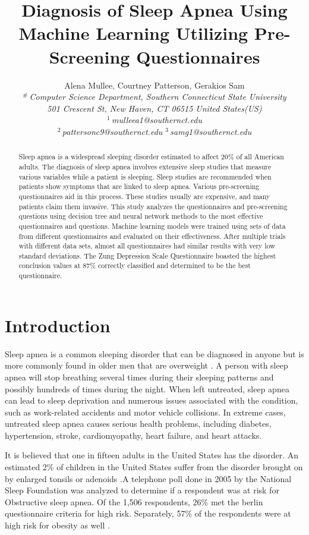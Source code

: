 \documentclass[10pt,conference,a4paper]{IEEEtran}
\title{Diagnosis of Sleep Apnea Using Machine Learning Utilizing Pre-Screening Questionnaires}
\author{%
{Alena Mullee, Courtney Patterson, Gerakios Sam}
\vspace{1.6mm}\\
\fontsize{10}{10}\selectfont\itshape
$^{\#}$\,Computer Science Department, Southern Connecticut State University\\
501 Crescent St, New Haven, CT 06515 United States(US)\\
\fontsize{9}{9}\selectfont\ttfamily\upshape
%
$^{1}$\,mulleea1@southernct.edu\\
$^{2}$\,pattersonc9@southernct.edu
$^{3}$\,samg1@southernct.edu%
\vspace{1.2mm}\\
\fontsize{10}{10}\selectfont\rmfamily\itshape
\fontsize{9}{9}\selectfont\ttfamily\upshape
}
\begin{document}
\maketitle
\begin{abstract} 
Sleep apnea is a widespread sleeping disorder estimated to affect 20\% of all American adults. The diagnosis of sleep apnea involves extensive sleep studies that measure various variables while a patient is sleeping. Sleep studies are recommended when patients show symptoms that are linked to sleep apnea. Various pre-screening questionnaires aid in this process. These studies usually are expensive, and many patients claim them invasive. This study analyzes the questionnaires and pre-screening questions using decision tree and neural network methods to the most effective questionnaires and questions. Machine learning models were trained using sets of data from different questionnaires and evaluated on their effectiveness. After multiple trials with different data sets, almost all questionnaires had similar results with very low standard deviations. The Zung Depression Scale Questionnaire boasted the highest conclusion values at 87\% correctly classified and determined to be the best questionnaire.
\end{abstract}
\section{Introduction}

Sleep apnea is a common sleeping disorder that can be diagnosed in anyone but is more commonly found in older men that are overweight \cite{clevelandClinic}. A person with sleep apnea will stop breathing several times during their sleeping patterns and possibly hundreds of times during the night\cite{Flemons2004}. When left untreated, sleep apnea can lead to sleep deprivation and numerous issues associated with the condition, such as work-related accidents and motor vehicle collisions. In extreme cases, untreated sleep apnea causes serious health problems, including diabetes, hypertension, stroke, cardiomyopathy, heart failure, and heart attacks\cite{clevelandClinic}. \par
It is believed that one in fifteen adults in the United States has the disorder. An estimated 2\% of children in the United States suffer from the disorder brought on by enlarged tonsils or adenoids\cite{apneaStats} .A telephone poll done in 2005 by the National Sleep Foundation was analyzed to determine if a respondent was at risk for Obstructive sleep apnea. Of the 1,506 respondents, 26\% met the berlin questionnaire criteria for high risk. Separately, 57\% of the respondents were at high risk for obesity as well \cite{hiestand2006}. 
\end{document}
